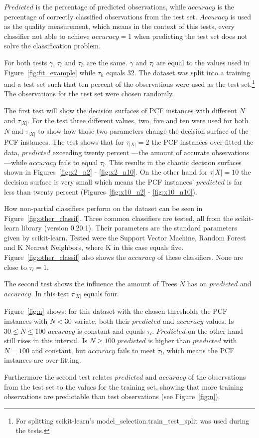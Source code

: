 $Predicted$ is the percentage of predicted observations,
while $accuracy$ is the percentage of correctly classified
observations from the test set. $Accuracy$ is used as the
quality measurement, which means in the context of this
tests, every classifier not able to achieve $accuracy = 1$
when predicting the test set does not solve the
classification problem.

For both tests $\gamma$, $\tau_l$ and $\tau_h$ are the
same. $\gamma$ and $\tau_l$ are equal to the values used in
Figure~\ref{fig:fit_example} while $\tau_h$ equals 32. The
dataset was split into a training and a test set such
that ten percent of the observations were used as the test
set.\footnote{For splitting scikit-learn's
  model\_selection.train\_test\_split was used during the
  tests.\cite{sklearn_api}} The observations for the test
set were chosen randomly.

The first test will show the decision surfaces of PCF
instances with different $N$ and $\tau_{|X|}$. For the test
three different values, two, five and ten were used for
both $N$ and $\tau_{|X|}$ to show how those two parameters
change the decision surface of the PCF instances. The test
shows that for $\tau_{|X|} = 2$ the PCF instances
over-fitted the data, $predicted$ exceeding twenty percent%
---the amount of accurate observations---while
$accuracy$ fails to equal $\tau_l$. This results in the
chaotic decision surfaces shown in Figures~\ref{fig:x2_n2}
- \ref{fig:x2_n10}. On the other hand for $\tau{|X|} = 10$
the decision surface is very small which means the PCF
instances' $predicted$ is far less than twenty percent
(Figures~\ref{fig:x10_n2} - \ref{fig:x10_n10}).

How non-partial classifiers perform on the dataset can be
seen in Figure~\ref{fig:other_classif}. Three common
classifiers are tested, all from the scikit-learn library
(version 0.20.1).\cite{sklearn_api}
Their parameters are the standard parameters given by
scikit-learn. Tested were the Support Vector Machine,
Random Forest and K Nearest Neighbors, where K in this case
equals five.\cite{sklearn_api}
Figure~\ref{fig:other_classif} also shows the $accuracy$ of
these classifiers. None are close to $\tau_l = 1$.

The second test shows the influence the amount of Trees $N$
has on $predicted$ and $accuracy$. In this test
$\tau_{|X|}$ equals four.

Figure~\ref{fig:n} shows: for this dataset with the
chosen thresholds the PCF instances with $N < 30$ variate,
both their $predicted$ and $accuracy$ values. Is $30 \leq N
\leq 100$ $accuracy$ is constant and equals $\tau_l$.
$Predicted$ on the other hand still rises in this
interval. Is $N \geq 100$ $predicted$ is higher than
$predicted$ with $N = 100$ and constant, but $accuracy$
fails to meet $\tau_l$, which means the PCF instances are
over-fitting.

Furthermore the second test relates $predicted$ and
$accuracy$ of the observations from the test set to the
values for the training set, showing that more training
observations are predictable than test observations
(see Figure~\ref{fig:n}).




